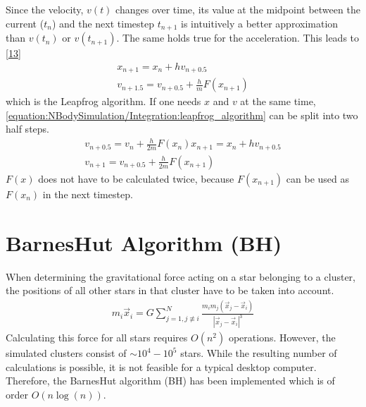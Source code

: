 \documentclass[letterpaper,10pt,english]{sphinxmanual}
\begin{document}
\sphinxAtStartPar
Since the velocity, \(v(t)\) changes over time, its value at the midpoint between the current (\(t_n\)) and the next timestep \(t_{n+1}\) is intuitively a better approximation than
\(v(t_n)\) or \(v(t_{n+1})\). The same holds true for the acceleration. This leads to {[}\hyperlink{cite.NBodySimulation/Appendix:id27}{13}{]}
\begin{equation}\label{equation:NBodySimulation/Integration:leapfrog_algorithm}
\begin{split}x_{n+1} = x_{n} + hv_{n+0.5}\\
v_{n+1.5} = v_{n+0.5} + \frac{h}{m}F(x_{n+1})\end{split}
\end{equation}
\sphinxAtStartPar
which is the Leapfrog algorithm. If one needs \(x\) and \(v\) at the same time, \eqref{equation:NBodySimulation/Integration:leapfrog_algorithm} can be split into two half steps.
\begin{equation*}
\begin{split}v_{n+0.5} = v_{n} + \frac{h}{2m}F(x_{n})
x_{n+1} = x_{n} + hv_{n+0.5}\\
v_{n+1} = v_{n+0.5} + \frac{h}{2m}F(x_{n+1})\end{split}
\end{equation*}
\sphinxAtStartPar
\(F(x)\) does not have to be calculated twice, because \(F(x_{n+1})\) can be used as \(F(x_{n})\) in the next timestep.


\section{Barnes\sphinxhyphen{}Hut Algorithm (BH)}
\label{\detokenize{NBodySimulation/Integration:barnes-hut-algorithm-bh}}
\sphinxAtStartPar
When determining the gravitational force acting on a star belonging to a cluster, the positions of all other stars in that cluster
have to be taken into account.
\begin{equation*}
\begin{split}m_i\vec{x}_i = G\sum_{j=1,j\not\equiv i}^{N}\frac{m_im_j\left ( \vec{x}_j-\vec{x}_i \right )}{\left | \vec{x}_j-\vec{x}_i \right |^3}\end{split}
\end{equation*}
\sphinxAtStartPar
Calculating this force for all stars requires \(O(n^2)\) operations.
However, the simulated clusters consist of \(\sim 10^4 - 10^5\) stars.
While the resulting number of calculations is possible, it is not feasible for a typical desktop computer.
Therefore, the Barnes\sphinxhyphen{}Hut algorithm (BH) has been implemented which is of order \(O(n\log(n))\).
\end{document}
